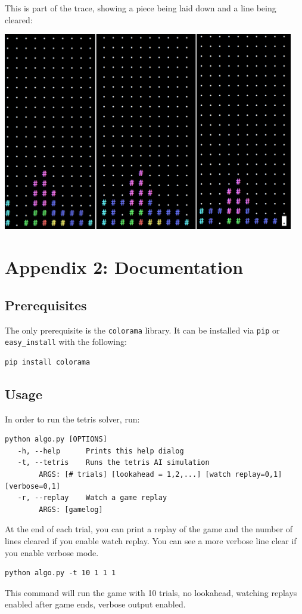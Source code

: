 \documentclass[12pt]{article}
\begin{document}
This is part of the trace, showing a piece being laid down and a line being cleared:

\includegraphics[width=5.0in]{exampleoutput.png}


\section{Appendix 2: Documentation}
\subsection{Prerequisites}
The only prerequisite is the \verb|colorama| library. It can be installed via \verb|pip| or \verb|easy_install| with the following:
\begin{verbatim}
pip install colorama
\end{verbatim}

\subsection{Usage}
In order to run the tetris solver, run:
\begin{verbatim}
python algo.py [OPTIONS]
   -h, --help      Prints this help dialog
   -t, --tetris    Runs the tetris AI simulation
        ARGS: [# trials] [lookahead = 1,2,...] [watch replay=0,1] [verbose=0,1]
   -r, --replay    Watch a game replay
        ARGS: [gamelog]
\end{verbatim}
At the end of each trial, you can print a replay of the game and the number of lines cleared if you enable watch replay. You can see a more verbose line clear if you enable verbose mode.

\begin{verbatim}
python algo.py -t 10 1 1 1
\end{verbatim}
This command will run the game with 10 trials, no lookahead, watching replays enabled after game ends, verbose output enabled.
\end{document}
